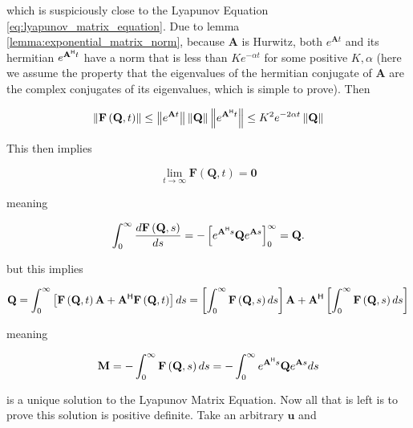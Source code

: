 	\noindent which is suspiciously close to the Lyapunov Equation \eqref{eq:lyapunov_matrix_equation}. Due to lemma \ref{lemma:exponential_matrix_norm}, because $\mathbf{A}$ is Hurwitz, both $e^{\mathbf{A}t}$ and its hermitian $e^{\mathbf{A}^{\mathsf{H}} t}$ have a norm that is less than $Ke^{-\alpha t}$ for some positive $K,\alpha$ (here we assume the property that the eigenvalues of the hermitian conjugate of $\mathbf{A}$ are the complex conjugates of its eigenvalues, which is simple to prove). Then 

\begin{equation} \left\lVert \mathbf{F}\left(\mathbf{Q},t\right) \right\rVert \leq  \left\lVert e^{\mathbf{A} t} \right\rVert \left\lVert \mathbf{Q} \right\rVert \left\lVert e^{\mathbf{A}^{\mathsf{H}} t} \right\rVert \leq K^2 e^{-2\alpha t}\left\lVert\mathbf{Q}\right\rVert \end{equation}

	This then implies

\begin{equation} \lim\limits_{t\to\infty} \mathbf{F}\left(\mathbf{Q},t\right) = \mathbf{0} \end{equation}


	\noindent meaning

\begin{equation} \int_0^\infty \dfrac{d\mathbf{F}\left(\mathbf{Q},s\right)}{ds} = -\left[e^{\mathbf{A}^{\mathsf{H}} s}\mathbf{Q}e^{\mathbf{A} s}\right]_0^\infty = \mathbf{Q} .\end{equation}

	\noindent but this implies

\begin{equation} \mathbf{Q} = \int_0^\infty \left[ \mathbf{F}\left(\mathbf{Q},t\right)\mathbf{A} + \mathbf{A}^{\mathsf{H}}\mathbf{F}\left(\mathbf{Q},t\right)\right]ds = \left[ \int_0^\infty \mathbf{F}\left(\mathbf{Q},s\right)ds\right]\mathbf{A} + \mathbf{A}^{\mathsf{H}} \left[ \int_0^\infty \mathbf{F}\left(\mathbf{Q},s\right)ds\right] \end{equation}

	\noindent meaning 

\begin{equation} \mathbf{M} = -\int_0^\infty \mathbf{F}\left(\mathbf{Q},s\right)ds = -\int_0^\infty e^{\mathbf{A}^{\mathsf{H}} s}\mathbf{Q}e^{\mathbf{A} s}ds \label{eq:lyapunov_matrix_equation_solution} \end{equation}

	\noindent is a unique solution to the Lyapunov Matrix Equation. Now all that is left is to prove this solution is positive definite. Take an arbitrary $\mathbf{u}$ and

